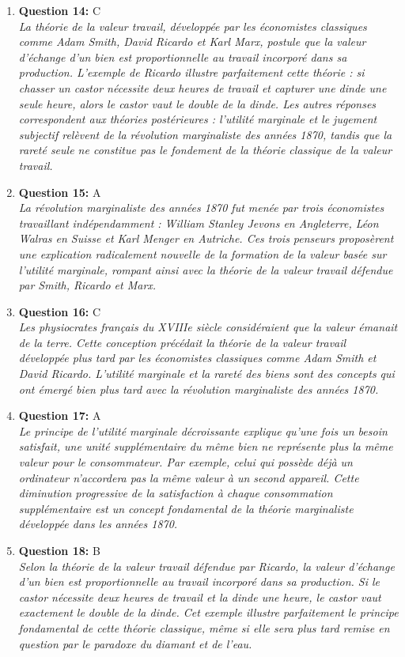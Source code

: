 \documentclass[12pt,a4paper]{article}
\begin{document}
\begin{enumerate}
\item \textbf{Question 14:} C
\\ \textit{La théorie de la valeur travail, développée par les économistes classiques comme Adam Smith, David Ricardo et Karl Marx, postule que la valeur d'échange d'un bien est proportionnelle au travail incorporé dans sa production. L'exemple de Ricardo illustre parfaitement cette théorie : si chasser un castor nécessite deux heures de travail et capturer une dinde une seule heure, alors le castor vaut le double de la dinde. Les autres réponses correspondent aux théories postérieures : l'utilité marginale et le jugement subjectif relèvent de la révolution marginaliste des années 1870, tandis que la rareté seule ne constitue pas le fondement de la théorie classique de la valeur travail.}

\item \textbf{Question 15:} A
\\ \textit{La révolution marginaliste des années 1870 fut menée par trois économistes travaillant indépendamment : William Stanley Jevons en Angleterre, Léon Walras en Suisse et Karl Menger en Autriche. Ces trois penseurs proposèrent une explication radicalement nouvelle de la formation de la valeur basée sur l'utilité marginale, rompant ainsi avec la théorie de la valeur travail défendue par Smith, Ricardo et Marx.}

\item \textbf{Question 16:} C
\\ \textit{Les physiocrates français du XVIIIe siècle considéraient que la valeur émanait de la terre. Cette conception précédait la théorie de la valeur travail développée plus tard par les économistes classiques comme Adam Smith et David Ricardo. L'utilité marginale et la rareté des biens sont des concepts qui ont émergé bien plus tard avec la révolution marginaliste des années 1870.}

\item \textbf{Question 17:} A
\\ \textit{Le principe de l'utilité marginale décroissante explique qu'une fois un besoin satisfait, une unité supplémentaire du même bien ne représente plus la même valeur pour le consommateur. Par exemple, celui qui possède déjà un ordinateur n'accordera pas la même valeur à un second appareil. Cette diminution progressive de la satisfaction à chaque consommation supplémentaire est un concept fondamental de la théorie marginaliste développée dans les années 1870.}

\item \textbf{Question 18:} B
\\ \textit{Selon la théorie de la valeur travail défendue par Ricardo, la valeur d'échange d'un bien est proportionnelle au travail incorporé dans sa production. Si le castor nécessite deux heures de travail et la dinde une heure, le castor vaut exactement le double de la dinde. Cet exemple illustre parfaitement le principe fondamental de cette théorie classique, même si elle sera plus tard remise en question par le paradoxe du diamant et de l'eau.}


\end{enumerate}
\end{document}
